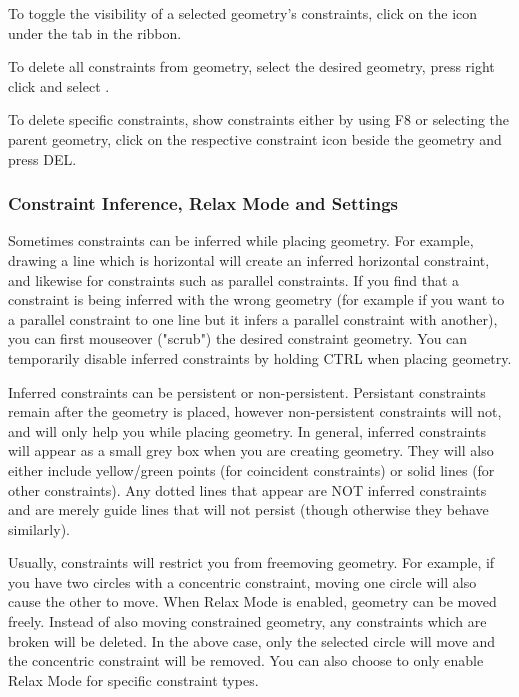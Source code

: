 To toggle the visibility of a selected geometry's constraints, click on the  icon under the  tab in the ribbon.

To delete all constraints from geometry, select the desired geometry, press right click and select .

To delete specific constraints, show constraints either by using F8 or selecting the parent geometry, click on the respective constraint icon beside the geometry and press DEL.

\subsubsection{Constraint Inference, Relax Mode and Settings}

Sometimes constraints can be inferred while placing geometry. For example, drawing a line which is horizontal will create an inferred horizontal constraint, and likewise for constraints such as parallel constraints. If you find that a constraint is being inferred with the wrong geometry (for example if you want to a parallel constraint to one line but it infers a parallel constraint with another), you can first mouseover ("scrub") the desired constraint geometry. You can temporarily disable inferred constraints by holding CTRL when placing geometry.

Inferred constraints can be persistent or non-persistent. Persistant constraints remain after the geometry is placed, however non-persistent constraints will not, and will only help you while placing geometry. In general, inferred constraints will appear as a small grey box when you are creating geometry. They will also either include yellow/green points (for coincident constraints) or solid lines (for other constraints). Any dotted lines that appear are NOT inferred constraints and are merely guide lines that will not persist (though otherwise they behave similarly).

Usually, constraints will restrict you from freemoving geometry. For example, if you have two circles with a concentric constraint, moving one circle will also cause the other to move. When Relax Mode is enabled, geometry can be moved freely. Instead of also moving constrained geometry, any constraints which are broken will be deleted. In the above case, only the selected circle will move and the concentric constraint will be removed. You can also choose to only enable Relax Mode for specific constraint types.

